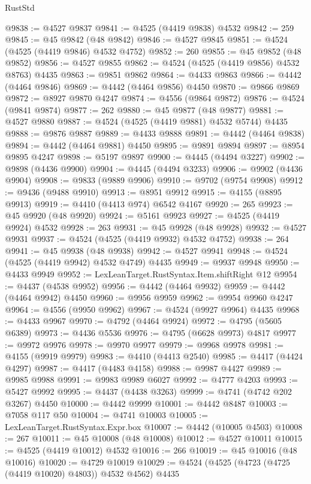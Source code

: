 \begin{lexlean}{RustStd}
\begin{coremodule}
@9838 := @4527 @9837
@9841 := @4525 (@4419 @9838) @4532
@9842 := 259
@9845 := @45 @9842 (@48 @9842)
@9846 := @4527 @9845
@9851 := @4524 (@4525 (@4419 @9846) @4532 @4752)
@9852 := 260
@9855 := @45 @9852 (@48 @9852)
@9856 := @4527 @9855
@9862 := @4524 (@4525 (@4419 @9856) @4532 @8763) @4435
@9863 := @9851 @9862
@9864 := @4433 @9863
@9866 := @4442 (@4464 @9846)
@9869 := @4442 (@4464 @9856) @4450
@9870 := @9866 @9869
@9872 := @8927 @9870 @4247
@9874 := @4556 (@9864 @9872)
@9876 := @4524 (@9841 @9874)
@9877 := 262
@9880 := @45 @9877 (@48 @9877)
@9881 := @4527 @9880
@9887 := @4524 (@4525 (@4419 @9881) @4532 @5744) @4435
@9888 := @9876 @9887
@9889 := @4433 @9888
@9891 := @4442 (@4464 @9838)
@9894 := @4442 (@4464 @9881) @4450
@9895 := @9891 @9894
@9897 := @8954 @9895 @4247
@9898 := @5197 @9897
@9900 := @4445 (@4494 @3227)
@9902 := @9898 (@4436 @9900)
@9904 := @4445 (@4494 @3233)
@9906 := @9902 (@4436 @9904)
@9908 := @9833 (@9889 @9906)
@9910 := @9702 (@9754 @9908)
@9912 := @9436 (@9488 @9910)
@9913 := @8951 @9912
@9915 := @4155 (@8895 @9913)
@9919 := @4410 (@4413 @974) @6542 @4167
@9920 := 265
@9923 := @45 @9920 (@48 @9920)
@9924 := @5161 @9923
@9927 := @4525 (@4419 @9924) @4532
@9928 := 263
@9931 := @45 @9928 (@48 @9928)
@9932 := @4527 @9931
@9937 := @4524 (@4525 (@4419 @9932) @4532 @4752)
@9938 := 264
@9941 := @45 @9938 (@48 @9938)
@9942 := @4527 @9941
@9948 := @4524 (@4525 (@4419 @9942) @4532 @4749) @4435
@9949 := @9937 @9948
@9950 := @4433 @9949
@9952 := LexLeanTarget.RustSyntax.Item.shiftRight @12
@9954 := @4437 (@4538 @9952)
@9956 := @4442 (@4464 @9932)
@9959 := @4442 (@4464 @9942) @4450
@9960 := @9956 @9959
@9962 := @9954 @9960 @4247
@9964 := @4556 (@9950 @9962)
@9967 := @4524 (@9927 @9964) @4435
@9968 := @4433 @9967
@9970 := @4792 (@4464 @9924)
@9972 := @4795 (@5605 @6389)
@9973 := @4436 @5536
@9976 := @4795 (@6628 @9973) @4817
@9977 := @9972 @9976
@9978 := @9970 @9977
@9979 := @9968 @9978
@9981 := @4155 (@9919 @9979)
@9983 := @4410 (@4413 @2540)
@9985 := @4417 (@4424 @4297)
@9987 := @4417 (@4483 @4158)
@9988 := @9987 @4427
@9989 := @9985 @9988
@9991 := @9983 @9989 @6027
@9992 := @4777 @4203
@9993 := @5427 @9992
@9995 := @4437 (@4438 @3263)
@9999 := @4741 (@4742 @202 @3267) @4450
@10000 := @4442 @9999
@10001 := @4442 @8487
@10003 := @7058 @117 @50
@10004 := @4741 @10003
@10005 := LexLeanTarget.RustSyntax.Expr.box
@10007 := @4442 (@10005 @4503)
@10008 := 267
@10011 := @45 @10008 (@48 @10008)
@10012 := @4527 @10011
@10015 := @4525 (@4419 @10012) @4532
@10016 := 266
@10019 := @45 @10016 (@48 @10016)
@10020 := @4729 @10019
@10029 := @4524 (@4525 (@4723 (@4725 (@4419 @10020) @4803)) @4532 @4562) @4435

\end{coremodule}
\end{lexlean}
